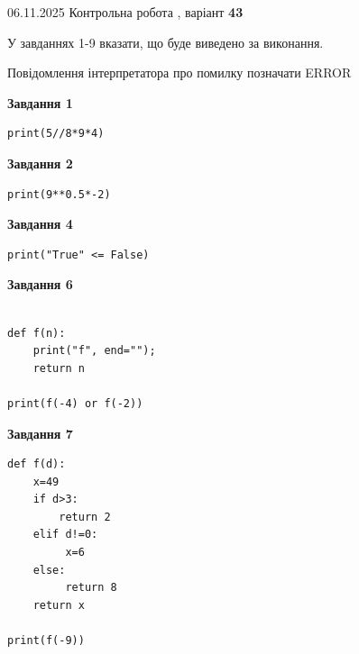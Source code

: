 \documentclass[12pt, ukrainian]{article}
\begin{document}
{\Large{06.11.2025 Контрольна робота , варіант  \No \textbf { 43 }\par}}
{
\begin {large}
У завданнях 1-9 вказати, що буде виведено за виконання.

Повідомлення інтерпретатора про помилку позначати ERROR

\begin{minipage}[t]{7.5cm}

\begin{center}
\textbf{Завдання 1}
\end{center}

\begin{verbatim}
print(5//8*9*4)
\end{verbatim}



\begin{center}
\textbf{Завдання 2}
\end{center}

\begin{verbatim}
print(9**0.5*-2)
\end{verbatim}



\begin{center}
\textbf{Завдання 4}
\end{center}

\begin{verbatim}
print("True" <= False)
\end{verbatim}



\begin{center}
\textbf{Завдання 6}
\end{center}

\begin{verbatim}

def f(n):
    print("f", end="");
    return n

print(f(-4) or f(-2))
\end{verbatim}



\begin{center}
\textbf{Завдання 7}
\end{center}

\begin{verbatim}
def f(d):
    x=49
    if d>3: 
        return 2
    elif d!=0:
         x=6
    else:
         return 8
    return x

print(f(-9))
\end{verbatim}


\end{minipage}
\end{large}}
\end{document}
